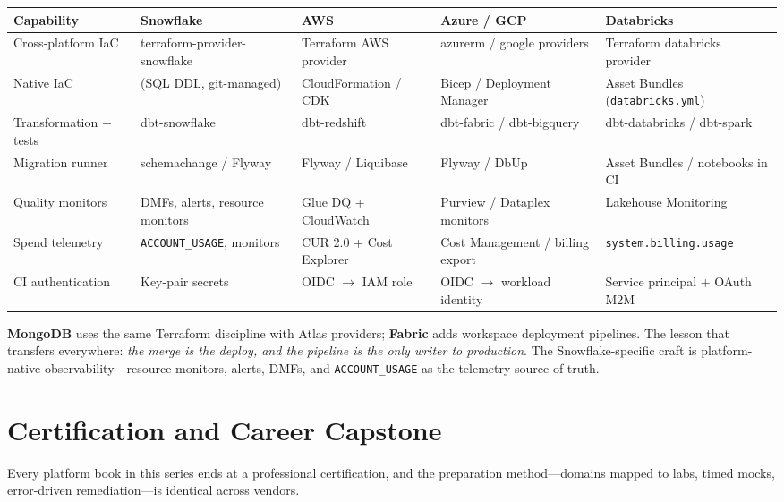 \begin{center}
\footnotesize
\begin{tabular}{@{}p{2.5cm}p{2.9cm}p{2.7cm}p{2.9cm}p{2.9cm}@{}}
\toprule
\textbf{Capability} & \textbf{Snowflake} & \textbf{AWS} & \textbf{Azure / GCP} & \textbf{Databricks} \\
\midrule
Cross-platform IaC & terraform-provider-snowflake & Terraform AWS provider & azurerm / google providers & Terraform databricks provider \\
Native IaC & (SQL DDL, git-managed) & CloudFormation / CDK & Bicep / Deployment Manager & Asset Bundles (\texttt{databricks.yml}) \\
Transformation + tests & dbt-snowflake & dbt-redshift & dbt-fabric / dbt-bigquery & dbt-databricks / dbt-spark \\
Migration runner & schemachange / Flyway & Flyway / Liquibase & Flyway / DbUp & Asset Bundles / notebooks in CI \\
Quality monitors & DMFs, alerts, resource monitors & Glue DQ + CloudWatch & Purview / Dataplex monitors & Lakehouse Monitoring \\
Spend telemetry & \texttt{ACCOUNT\_USAGE}, monitors & CUR 2.0 + Cost Explorer & Cost Management / billing export & \texttt{system.billing.usage} \\
CI authentication & Key-pair secrets & OIDC $\rightarrow$ IAM role & OIDC $\rightarrow$ workload identity & Service principal + OAuth M2M \\
\bottomrule
\end{tabular}
\end{center}

\noindent \textbf{MongoDB} uses the same Terraform discipline with Atlas providers;
\textbf{Fabric} adds workspace deployment pipelines. The lesson that transfers everywhere:
\emph{the merge is the deploy, and the pipeline is the only writer to production}. The
Snowflake-specific craft is platform-native observability---resource monitors, alerts, DMFs, and
\texttt{ACCOUNT\_USAGE} as the telemetry source of truth.

\section{Certification and Career Capstone}
%
Every platform book in this series ends at a professional certification, and the preparation
method---domains mapped to labs, timed mocks, error-driven remediation---is identical across
vendors.

